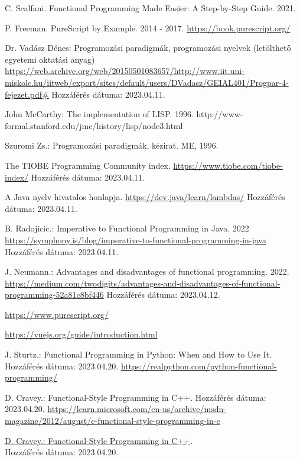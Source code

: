 \documentclass[12pt]{article}
\begin{document}
\begin{thebibliography}{99}

C. Scalfani. Functional Programming Made Easier: A Step-by-Step Guide. 2021.

P. Freeman. PureScript by Example. 2014 - 2017.
\url{https://book.purescript.org/}

Dr. Vadász Dénes: Programozási paradigmák, programozási nyelvek (letölthető egyetemi oktatási anyag)
\url{https://web.archive.org/web/20150501083657/http://www.iit.uni-miskolc.hu/iitweb/export/sites/default/users/DVadasz/GEIAL401/Progpar-4-fejezet.pdf#}
Hozzáférés dátuma: 2023.04.11.

John McCarthy: The implementation of LISP. 1996.
http://www-formal.stanford.edu/jmc/history/lisp/node3.html

Szuromi Zs.: Programozási paradigmák, kézirat. ME, 1996.

The TIOBE Programming Community index. \url{https://www.tiobe.com/tiobe-index/} Hozzáférés dátuma: 2023.04.11.

A Java nyelv hivatalos honlapja. \url{https://dev.java/learn/lambdas/}  Hozzáférés dátuma: 2023.04.11.

B. Radojicic.: Imperative to Functional Programming in Java. 2022
\url{https://symphony.is/blog/imperative-to-functional-programming-in-java} Hozzáférés dátuma: 2023.04.11.

J. Neumann.: Advantages and disadvantages of functional programming. 2022.
\url{https://medium.com/twodigits/advantages-and-disadvantages-of-functional-programming-52a81c8bf446}
Hozzáférés dátuma: 2023.04.12.

\url{https://www.purescript.org/}

\url{https://vuejs.org/guide/introduction.html}

J. Sturtz.: Functional Programming in Python: When and How to Use It. Hozzáférés dátuma: 2023.04.20.
\url{https://realpython.com/python-functional-programming/}

D. Cravey.: Functional-Style Programming in C++. Hozzáférés dátuma: 2023.04.20.
\url{https://learn.microsoft.com/en-us/archive/msdn-magazine/2012/august/c-functional-style-programming-in-c}

\href{https://learn.microsoft.com/en-us/archive/msdn-magazine/2012/august/c-functional-style-programming-in-c}{D. Cravey.: Functional-Style Programming in C++}.\\ Hozzáférés dátuma: 2023.04.20.


\end{thebibliography}
\end{document}
